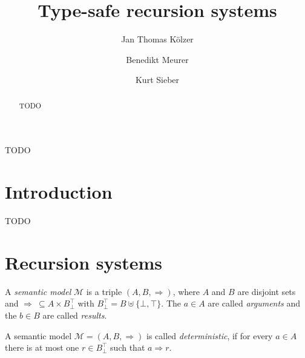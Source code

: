\documentclass[a4paper,final,preprint,sort&compress]{elsarticle}
\DeclareMathOperator{\dom}{dom}
\DeclareMathOperator{\pto}{\hookrightarrow}
\begin{document}
\begin{frontmatter}

\title{Type-safe recursion systems}

\author[fnt]{Jan Thomas K\"olzer}
\author[cus]{Benedikt Meurer}
\author[cus]{Kurt Sieber}
\address[fnt]{Naturwissenschaftlich-Technische Fakult\"at, Universit\"at Siegen, D-57068 Siegen, Germany}
\address[cus]{Compilerbau und Softwareanalyse, Universit\"at Siegen, D-57068 Siegen, Germany}

\begin{abstract}
  TODO
\end{abstract}

\begin{keyword}
  TODO
\end{keyword}

\end{frontmatter}


\section{Introduction}
\label{sec:Introduction}


TODO


\section{Recursion systems}
\label{sec:Recursion_systems}

\newcommand{\M}{\ensuremath{\mathcal{M}}}

A \emph{semantic model} $\M$ is a triple $(A,B,\Rightarrow)$, where $A$ and $B$ are disjoint sets
and \mbox{$\Rightarrow~\subseteq A \times B_\bot^\top$} with $B_\bot^\top = B \uplus \{\bot,\top\}$. The $a \in A$
are called \emph{arguments} and the $b \in B$ are called \emph{results}.

\begin{definition}
  A semantic model $\M = (A,B,\Rightarrow)$ is called \emph{deterministic}, if for every $a \in A$
  there is at most one $r \in B_\bot^\top$ such that $a \Rightarrow r$.
\end{definition}

\end{document}
